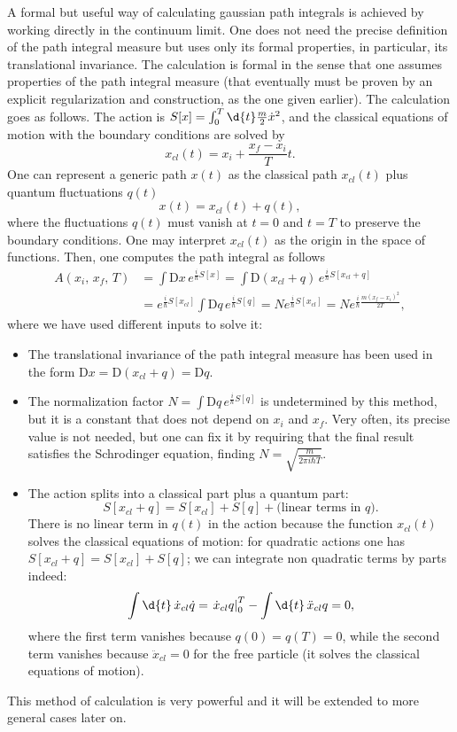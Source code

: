 A formal but useful way of calculating gaussian path integrals is achieved by working directly in the continuum limit. One does not need the precise definition of the path integral measure but uses only its formal properties, in particular, its translational invariance. The calculation is formal in the sense that one assumes properties of the path integral measure (that eventually must be proven by an explicit regularization and construction, as the one given earlier). The calculation goes as follows. The action is \(S[x]= \int_0^T \d{t} \frac{m}{2}\dot{x}^2\), and the classical equations of motion with the boundary conditions are solved by
\[
    x_{cl} (t) = x_i + \frac{x_f - x_i}{T}t.
\]
One can represent a generic path \(x(t)\) as the classical path \(x_{cl}(t)\) plus quantum fluctuations \(q(t)\)
\[
    x(t) = x_{cl}(t) + q(t),
\]
where the fluctuations \(q(t)\) must vanish at \(t=0\) and \(t=T\) to preserve the boundary conditions. One may interpret \(x_{cl}(t)\) as the origin in the space of functions. Then, one computes the path integral as follows
\[
    \begin{aligned}
        A(x_i,\,x_f,\,T) & = \int \mathrm{D} x \, e^{\frac{i}{\hbar}S[x]} = \int \mathrm{D} (x_{cl} + q) \, e^{\frac{i}{\hbar} S[x_{cl} + q]}                                              \\
                         & = e^{\frac{i}{\hbar} S[x_{cl}]} \int \mathrm{D} q \, e^{\frac{i}{\hbar} S[q]} = N e^{\frac{i}{\hbar} S[x_{cl}]} = N e^{\frac{i}{\hbar}\frac{m(x_f-x_i)^2}{2T}},
    \end{aligned}
\]
where we have used different inputs to solve it:
\begin{itemize}
    \item The translational invariance of the path integral measure has been used in the form \(\mathrm{D}x = \mathrm{D}(x_{cl}+q) = \mathrm{D}q\).
    \item The normalization factor \(N = \int \mathrm{D} q\, e^ {\frac{i}{\hbar} S[q]}\) is undetermined by this method, but it is a constant that does not depend on \(x_i\) and \(x_f\). Very often, its precise value is not needed, but one can fix it by requiring that the final result satisfies the Schrodinger equation, finding \(N = \sqrt{\frac{m}{2\pi i \hbar T}}\).
    \item The action splits into a classical part plus a quantum part:
          \[
              S[x_{cl} + q] = S[x_{cl}] + S[q] + \text{(linear terms in } q\text{)}.
          \]
          There is no linear term in \(q(t)\) in the action because the function \(x_{cl}(t)\) solves the classical equations of motion: for quadratic actions one has \(S[x_{cl} + q] = S[x_{cl}] + S[q]\); we can integrate non quadratic terms by parts indeed:
          \[
              \int \d{t} \, \dot{x}_{cl} \dot{q} = \left. \dot{x}_{cl} q \right|_0^T - \int \d{t} \, \ddot{x}_{cl} q = 0,
          \]
          where the first term vanishes because \(q(0) = q(T) = 0\), while the second term vanishes because \(\ddot{x}_{cl} = 0\) for the free particle (it solves the classical equations of motion).
\end{itemize}
This method of calculation is very powerful and it will be extended to more general cases later on.

